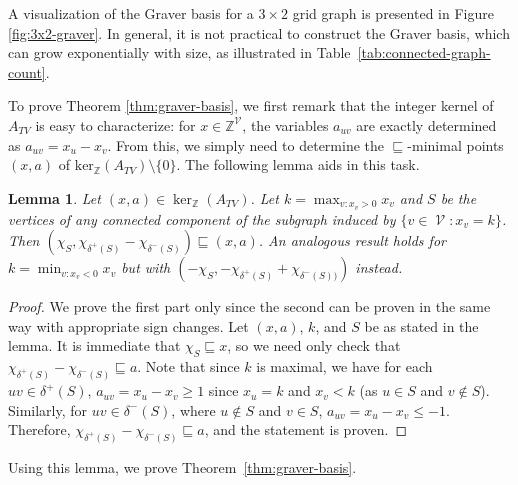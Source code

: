 \documentclass[pdflatex,sn-mathphys-num]{sn-jnl}%
\newtheorem{lemma}[theorem]{Lemma}
\newcommand{\Z}{\mathbb{Z}} %
\DeclareMathOperator{\Vcal}{\mathcal{V}}
\begin{document}
A visualization of the Graver basis for a $3\times 2$ grid graph is presented in Figure \ref{fig:3x2-graver}. In general, it is not practical to construct the Graver basis, which can grow exponentially with size, as illustrated in Table~\ref{tab:connected-graph-count}. 

To prove Theorem \ref{thm:graver-basis}, we first remark that the integer kernel of $A_{TV}$ is easy to characterize: for $x \in \mathbb{Z}^{\Vcal}$, the variables $a_{uv}$ are exactly determined as $a_{uv} = x_u - x_v$. From this, we simply need to determine the $\sqsubseteq$-minimal points $(x,a)$ of $\text{ker}_{\mathbb{Z}}(A_{TV}) \setminus \{0\}$. The following lemma aids in this task.

\begin{lemma} \label{lem:TV-majorizer}
    Let $(x, a) \in \ker_{\Z}(A_{TV})$. Let $k = \max_{v:x_v > 0} x_v$ and $S$ be the vertices of any connected component of the subgraph induced by $\{v \in \Vcal : x_v = k\}$. Then $(\chi_S, \chi_{\delta^+(S)} - \chi_{\delta^-(S)}) \sqsubseteq (x, a)$. An analogous result holds for $k = \min_{v: x_v < 0} x_v$ but with $(-\chi_S, -\chi_{\delta^+(S)} + \chi_{\delta^-(S))})$ instead. 
\end{lemma}
\begin{proof}
    We prove the first part only since the second can be proven in the same way with appropriate sign changes. Let $(x,a)$, $k$, and $S$ be as stated in the lemma. It is immediate that $\chi_S \sqsubseteq x$, so we need only check that $\chi_{\delta^+(S)} - \chi_{\delta^-(S)} \sqsubseteq a$. Note that since $k$ is maximal, we have for each $uv \in \delta^+(S)$, $a_{uv} = x_u - x_v \ge 1$ since $x_u = k$ and $x_v < k$ (as $u \in S$ and $v \notin S$). Similarly, for $uv \in \delta^-(S)$, where $u \notin S$ and $v\in S$, $a_{uv} = x_u - x_v \le -1$. Therefore, $\chi_{\delta^+(S)} - \chi_{\delta^-(S)} \sqsubseteq a$, and the statement is proven.
\end{proof}

Using this lemma, we prove Theorem~\ref{thm:graver-basis}.
\end{document}
